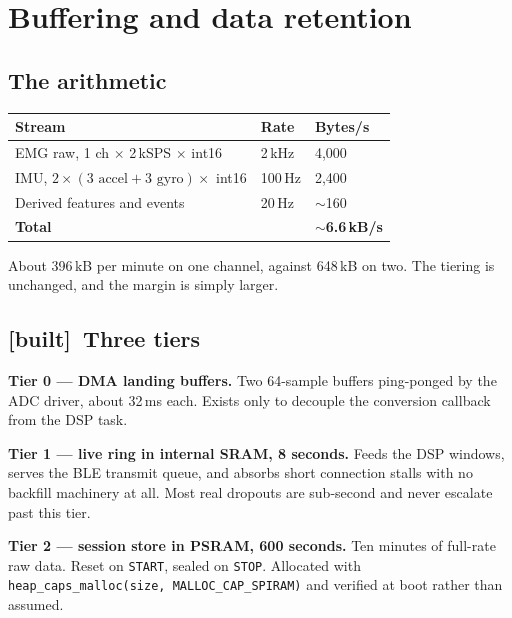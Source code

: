 \documentclass[11pt]{article}
\newcommand{\built}{{\sffamily\scriptsize\color{good}\textbf{[built]}}\ }
\begin{document}
\section{Buffering and data retention}

\subsection{The arithmetic}

\begin{table}[H]
\centering\small
\begin{tabularx}{\linewidth}{@{}X p{22mm} p{22mm}@{}}
\toprule
\textbf{Stream} & \textbf{Rate} & \textbf{Bytes/s} \\
\midrule
EMG raw, 1 ch $\times$ 2\,kSPS $\times$ int16 & 2\,kHz & 4{,}000 \\
IMU, $2 \times (3 \text{ accel} + 3 \text{ gyro}) \times$ int16 & 100\,Hz & 2{,}400 \\
Derived features and events & 20\,Hz & $\sim$160 \\
\midrule
\textbf{Total} & & \textbf{$\sim$6.6\,kB/s} \\
\bottomrule
\end{tabularx}
\end{table}

\noindent
About 396\,kB per minute on one channel, against 648\,kB on two. The tiering
is unchanged, and the margin is simply larger.

\subsection{\built Three tiers}

\textbf{Tier 0 --- DMA landing buffers.} Two 64-sample buffers ping-ponged by
the ADC driver, about 32\,ms each. Exists only to decouple the conversion
callback from the DSP task.

\textbf{Tier 1 --- live ring in internal SRAM, 8 seconds.} Feeds the DSP
windows, serves the BLE transmit queue, and absorbs short connection stalls
with no backfill machinery at all. Most real dropouts are sub-second and never
escalate past this tier.

\textbf{Tier 2 --- session store in PSRAM, 600 seconds.} Ten minutes of
full-rate raw data. Reset on \texttt{START}, sealed on \texttt{STOP}.
Allocated with \texttt{heap\_caps\_malloc(size, MALLOC\_CAP\_SPIRAM)} and
verified at boot rather than assumed.
\end{document}
